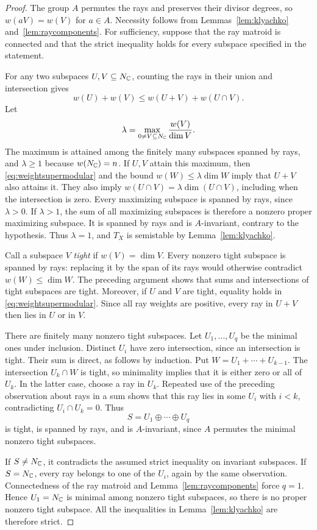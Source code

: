 \begin{proof}
The group $A$ permutes the rays and preserves their divisor degrees,
so $w(aV)=w(V)$ for $a\in A$. Necessity follows from
Lemmas~\ref{lem:klyachko} and~\ref{lem:raycomponents}.
For sufficiency, suppose that the ray matroid is connected and that
the strict inequality holds for every subspace specified in the statement.

For any two subspaces $U,V\subseteq N_{\mathbb{C}}$, counting the rays in their
union and intersection gives
\begin{equation}\label{eq:weightsupermodular}
 w(U)+w(V)\le w(U+V)+w(U\cap V).
\end{equation}
Let
\[
 \lambda=\max_{0\ne V\subseteq N_{\mathbb{C}}}\frac{w(V)}{\dim V}.
\]
The maximum is attained among the finitely many subspaces spanned by
rays, and $\lambda\ge1$ because $w(N_{\mathbb{C}})=n$. If $U,V$ attain this
maximum, then \eqref{eq:weightsupermodular} and the bound
$w(W)\le\lambda\dim W$ imply that $U+V$ also attains it. They also
imply $w(U\cap V)=\lambda\dim(U\cap V)$, including when the
intersection is zero.
Every maximizing subspace is spanned by rays, since $\lambda>0$.
If $\lambda>1$, the sum of all maximizing subspaces is therefore a
nonzero proper maximizing subspace. It is spanned by rays and is
$A$-invariant, contrary to the hypothesis. Thus $\lambda=1$, and
$T_X$ is semistable by Lemma~\ref{lem:klyachko}.

Call a subspace $V$ \emph{tight} if $w(V)=\dim V$. Every nonzero tight
subspace is spanned by rays: replacing it by the span of its rays
would otherwise contradict $w(W)\le\dim W$.
The preceding argument shows that sums and intersections of tight
subspaces are tight. Moreover, if $U$ and $V$ are tight, equality
holds in \eqref{eq:weightsupermodular}. Since all ray weights are
positive, every ray in $U+V$ then lies in $U$ or in $V$.

There are finitely many nonzero tight subspaces. Let
$U_1,\ldots,U_q$ be the minimal ones under inclusion. Distinct $U_i$
have zero intersection, since an intersection is tight. Their sum is
direct, as follows by induction. Put $W=U_1+\cdots+U_{k-1}$.
The intersection $U_k\cap W$ is tight, so minimality implies that it
is either zero or all of $U_k$. In the latter case, choose a ray in
$U_k$. Repeated use of the preceding observation about rays in a sum shows that
this ray lies in some $U_i$ with $i<k$, contradicting
$U_i\cap U_k=0$. Thus
\[
 S=U_1\oplus\cdots\oplus U_q
\]
is tight, is spanned by rays, and is $A$-invariant, since $A$ permutes
the minimal nonzero tight subspaces.

If $S\ne N_{\mathbb{C}}$, it contradicts the assumed strict inequality on
invariant subspaces. If $S=N_{\mathbb{C}}$, every ray belongs to one of the
$U_i$, again by the same observation. Connectedness of the ray
matroid and Lemma~\ref{lem:raycomponents} force $q=1$. Hence
$U_1=N_{\mathbb{C}}$ is minimal among nonzero tight subspaces, so there is no
proper nonzero tight subspace. All the inequalities in
Lemma~\ref{lem:klyachko} are therefore strict.
\end{proof}
